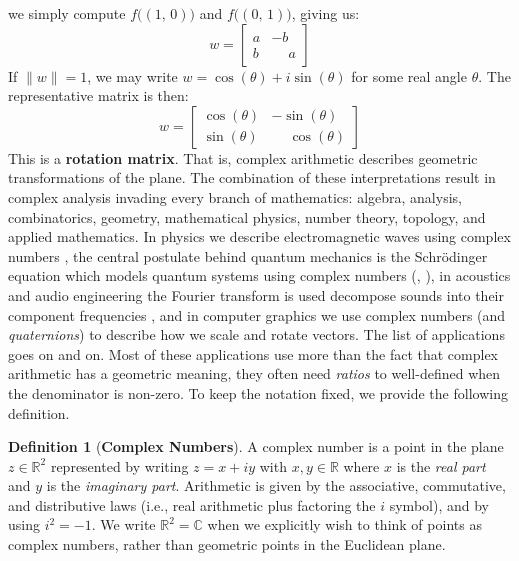 \documentclass{article}
\theoremstyle{definition}
\newtheorem{definition}{Definition}[section]
\begin{document}
        we simply compute $f\big((1,\,0)\big)$ and $f\big((0,\,1)\big)$,
        giving us:
        \begin{equation}
            w=
            \begin{bmatrix}
                a&-b\\
                b&\phantom{+}a
            \end{bmatrix}
        \end{equation}
        If $\|w\|=1$, we may write $w=\cos(\theta)+i\sin(\theta)$ for some
        real angle $\theta$. The representative matrix is then:
        \begin{equation}
            w=
            \begin{bmatrix}
                \cos(\theta)&-\sin(\theta)\\[0.5em]
                \sin(\theta)&\phantom{+}\cos(\theta)
            \end{bmatrix}
        \end{equation}
        This is a \textbf{rotation matrix}. That is, complex arithmetic
        describes geometric transformations of the plane. The combination
        of these interpretations result in complex analysis invading every
        branch of mathematics: algebra, analysis, combinatorics, geometry,
        mathematical physics, number theory, topology, and applied mathematics.
        In physics we describe electromagnetic waves using complex numbers
        \cite[p.~380]{WangsnessElectromagneticFields}, the central postulate
        behind quantum mechanics is the Schr\"{o}dinger equation which models
        quantum systems using complex numbers
        (\cite[p.~1]{GriffithsQuantumMechanics},
        \cite[p.~68]{McIntyreQuantumMechanics}), in acoustics and
        audio engineering the Fourier transform is used decompose sounds into
        their component frequencies
        \cite[p.~28]{MorseIngbardTheoreticalAcoustics}, and in computer
        graphics we use complex numbers (and \textit{quaternions}) to describe
        how we scale and rotate vectors. The list of applications goes on
        and on. Most of these applications use more than the fact that complex
        arithmetic has a geometric meaning, they often need \textit{ratios}
        to well-defined when the denominator is non-zero.
        To keep the notation fixed, we provide the following definition.
        \begin{definition}[\textbf{Complex Numbers}]
            A complex number is a point in the plane $z\in\mathbb{R}^{2}$
            represented by writing $z=x+iy$ with $x,y\in\mathbb{R}$ where $x$
            is the \textit{real part} and $y$ is the \textit{imaginary part}.
            Arithmetic is given by the associative, commutative, and
            distributive laws (i.e., real arithmetic plus factoring the $i$
            symbol), and by using $i^{2}=-1$. We write
            $\mathbb{R}^{2}=\mathbb{C}$ when we explicitly wish to think of
            points as complex numbers, rather than geometric points in the
            Euclidean plane.
        \end{definition}
\end{document}
